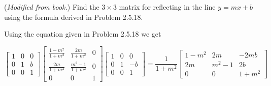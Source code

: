 \documentclass[../main.tex]{subfiles}
\begin{document}
(\emph{Modified from book.})
Find the $3\times3$ matrix for reflecting in the line $y = mx + b$ using the formula derived in Problem 2.5.18.

\solution

Using the equation given in Problem 2.5.18 we get

\[ \begin{bmatrix}
      1&0&0\\
      0&1&b\\
      0&0&1
    \end{bmatrix}
    \begin{bmatrix}
      \frac{1-m^2}{1+m^2}&\frac{2m}{1+m^2}&0\\
      \frac{2m}{1+m^2}&\frac{m^2-1}{1+m^2}&0\\
      0&0&1
    \end{bmatrix}
    \begin{bmatrix}
      1&0&0\\
      0&1&-b\\
      0&0&1
    \end{bmatrix}
    =
    \frac{1}{1+m^2}
    \begin{bmatrix}
      1-m^2 & 2m & -2mb\\
      2m & m^2-1 & 2b\\
      0&0&1+m^2
    \end{bmatrix}
\]
\end{document}
